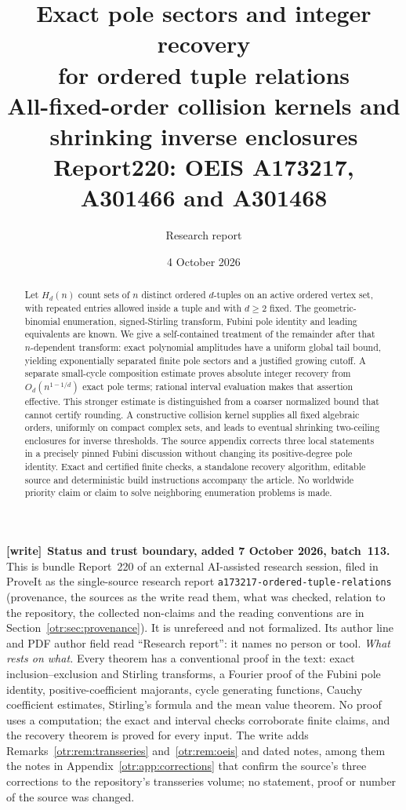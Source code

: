 \documentclass[11pt,a4paper]{article}
\title{\textbf{Exact pole sectors and integer recovery\\for ordered tuple relations}\\[5pt]\large All-fixed-order collision kernels and shrinking inverse enclosures\\[6pt]\normalsize Report220: OEIS A173217, A301466 and A301468}
\author{Research report}
\date{4 October 2026}
\theoremstyle{definition}\newtheorem{definition}[theorem]{Definition}
\theoremstyle{remark}\newtheorem{remark}[theorem]{Remark}
\newcommand{\file}[1]{\nolinkurl{#1}}
\newenvironment{writenote}[1][]{\par\smallskip\begingroup\small
 \noindent\textbf{[write]}\if\relax\detokenize{#1}\relax\else~\textbf{#1.}\fi\ }%
 {\par\endgroup\smallskip}
\begin{document}
\maketitle
\begin{abstract}
Let $H_d(n)$ count sets of $n$ distinct ordered $d$-tuples on an active ordered vertex set, with repeated entries allowed inside a tuple and with $d\ge2$ fixed. The geometric-binomial enumeration, signed-Stirling transform, Fubini pole identity and leading equivalents are known. We give a self-contained treatment of the remainder after that $n$-dependent transform: exact polynomial amplitudes have a uniform global tail bound, yielding exponentially separated finite pole sectors and a justified growing cutoff. A separate small-cycle composition estimate proves absolute integer recovery from $O_d(n^{1-1/d})$ exact pole terms; rational interval evaluation makes that assertion effective. This stronger estimate is distinguished from a coarser normalized bound that cannot certify rounding. A constructive collision kernel supplies all fixed algebraic orders, uniformly on compact complex sets, and leads to eventual shrinking two-ceiling enclosures for inverse thresholds. The source appendix corrects three local statements in a precisely pinned Fubini discussion without changing its positive-degree pole identity. Exact and certified finite checks, a standalone recovery algorithm, editable source and deterministic build instructions accompany the article. No worldwide priority claim or claim to solve neighboring enumeration problems is made.
\end{abstract}
\begin{writenote}[Status and trust boundary, added 7 October 2026, batch~113]
This is bundle Report~220 of an external AI-assisted research session, filed
in ProveIt as the single-source research report
\file{a173217-ordered-tuple-relations} (provenance, the sources as the write
read them, what was checked, relation to the repository, the collected
non-claims and the reading conventions are in
Section~\ref{otr:sec:provenance}). It is unrefereed and not formalized. Its
author line and PDF author field read ``Research report'': it names no person
or tool. \emph{What rests on what.} Every theorem has a conventional proof in
the text: exact inclusion--exclusion and Stirling transforms, a Fourier proof
of the Fubini pole identity, positive-coefficient majorants, cycle generating
functions, Cauchy coefficient estimates, Stirling's formula and the mean value
theorem. No proof uses a computation; the exact and interval checks
corroborate finite claims, and the recovery theorem is proved for every input.
The write adds Remarks~\ref{otr:rem:transseries} and~\ref{otr:rem:oeis} and
dated notes, among them the notes in Appendix~\ref{otr:app:corrections} that
confirm the source's three corrections to the repository's transseries volume;
no statement, proof or number of the source was changed.
\end{writenote}
\begingroup\small\setcounter{tocdepth}{1}\tableofcontents\endgroup
\newpage
\end{document}
